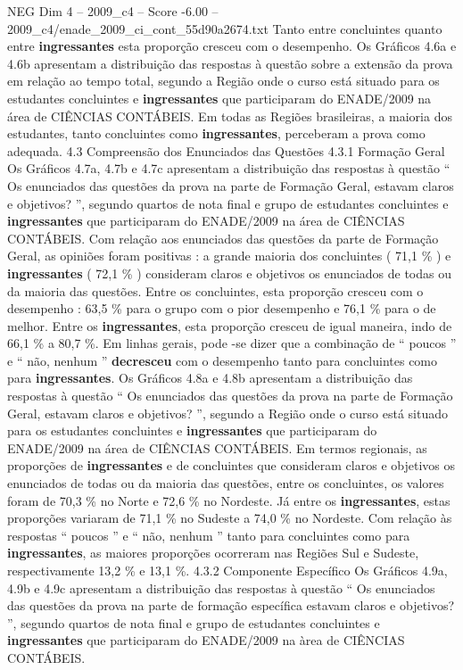 \begin{textsample}{NEG Dim 4 – 2009\_c4 – Score -6.00 – 2009\_c4/enade\_2009\_ci\_cont\_55d90a2674.txt}
Tanto entre concluintes quanto entre \textbf{ingressantes} esta proporção cresceu com o desempenho.
Os Gráficos 4.6a e 4.6b apresentam a distribuição das respostas à questão sobre a extensão da prova em relação ao tempo total, segundo a Região onde o curso está situado para os estudantes concluintes e \textbf{ingressantes} que participaram do ENADE/2009 na área de CIÊNCIAS CONTÁBEIS.
Em todas as Regiões brasileiras, a maioria dos estudantes, tanto concluintes como \textbf{ingressantes}, perceberam a prova como adequada. 4.3 Compreensão dos Enunciados das Questões 4.3.1 Formação Geral Os Gráficos 4.7a, 4.7b e 4.7c apresentam a distribuição das respostas à questão “ Os enunciados das questões da prova na parte de Formação Geral, estavam claros e objetivos? ”, segundo quartos de nota final e grupo de estudantes concluintes e \textbf{ingressantes} que participaram do ENADE/2009 na área de CIÊNCIAS CONTÁBEIS.
Com relação aos enunciados das questões da parte de Formação Geral, as opiniões foram positivas : a grande maioria dos concluintes ( 71,1 \% ) e \textbf{ingressantes} ( 72,1 \% ) consideram claros e objetivos os enunciados de todas ou da maioria das questões.
Entre os concluintes, esta proporção cresceu com o desempenho : 63,5 \% para o grupo com o pior desempenho e 76,1 \% para o de melhor.
Entre os \textbf{ingressantes}, esta proporção cresceu de igual maneira, indo de 66,1 \% a 80,7 \%.
Em linhas gerais, pode -se dizer que a combinação de “ poucos ” e “ não, nenhum ” \textbf{decresceu} com o desempenho tanto para concluintes como para \textbf{ingressantes}.
Os Gráficos 4.8a e 4.8b apresentam a distribuição das respostas à questão “ Os enunciados das questões da prova na parte de Formação Geral, estavam claros e objetivos? ”, segundo a Região onde o curso está situado para os estudantes concluintes e \textbf{ingressantes} que participaram do ENADE/2009 na área de CIÊNCIAS CONTÁBEIS.
Em termos regionais, as proporções de \textbf{ingressantes} e de concluintes que consideram claros e objetivos os enunciados de todas ou da maioria das questões, entre os concluintes, os valores foram de 70,3 \% no Norte e 72,6 \% no Nordeste.
Já entre os \textbf{ingressantes}, estas proporções variaram de 71,1 \% no Sudeste a 74,0 \% no Nordeste.
Com relação às respostas “ poucos ” e “ não, nenhum ” tanto para concluintes como para \textbf{ingressantes}, as maiores proporções ocorreram nas Regiões Sul e Sudeste, respectivamente 13,2 \% e 13,1 \%. 4.3.2 Componente Específico Os Gráficos 4.9a, 4.9b e 4.9c apresentam a distribuição das respostas à questão “ Os enunciados das questões da prova na parte de formação específica estavam claros e objetivos? ”, segundo quartos de nota final e grupo de estudantes concluintes e \textbf{ingressantes} que participaram do ENADE/2009 na àrea de CIÊNCIAS CONTÁBEIS.

\end{textsample}
